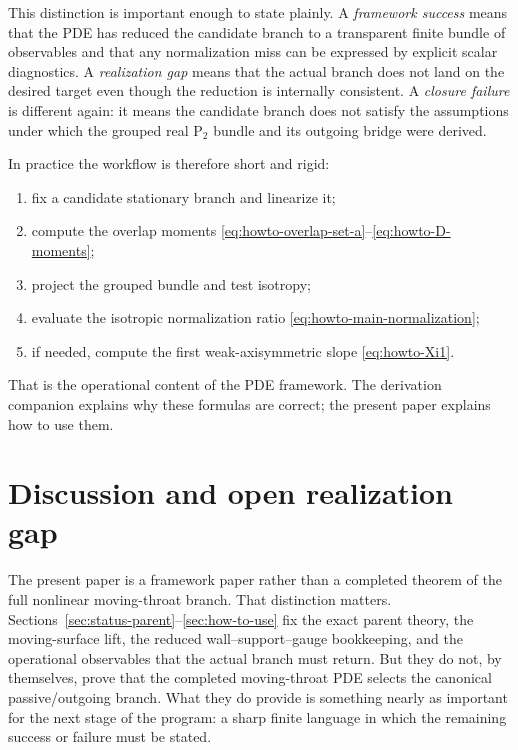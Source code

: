\documentclass[11pt]{article}
\theoremstyle{definition}
\newcommand{\Ptwo}{\ensuremath{\mathrm{P}_2}}
\begin{document}
This distinction is important enough to state plainly. A \emph{framework success} means that the PDE has reduced the candidate branch to a transparent finite bundle of observables and that any normalization miss can be expressed by explicit scalar diagnostics. A \emph{realization gap} means that the actual branch does not land on the desired target even though the reduction is internally consistent. A \emph{closure failure} is different again: it means the candidate branch does not satisfy the assumptions under which the grouped real $\Ptwo$ bundle and its outgoing bridge were derived.

In practice the workflow is therefore short and rigid:
\begin{enumerate}
    \item fix a candidate stationary branch and linearize it;
    \item compute the overlap moments \eqref{eq:howto-overlap-set-a}--\eqref{eq:howto-D-moments};
    \item project the grouped bundle and test isotropy;
    \item evaluate the isotropic normalization ratio \eqref{eq:howto-main-normalization};
    \item if needed, compute the first weak-axisymmetric slope \eqref{eq:howto-Xi1}.
\end{enumerate}
That is the operational content of the PDE framework. The derivation companion explains why these formulas are correct; the present paper explains how to use them.

\section{Discussion and open realization gap}
\label{sec:discussion-gap}

The present paper is a framework paper rather than a completed theorem of the full nonlinear moving-throat branch. That distinction matters. Sections~\ref{sec:status-parent}--\ref{sec:how-to-use} fix the exact parent theory, the moving-surface lift, the reduced wall--support--gauge bookkeeping, and the operational observables that the actual branch must return. But they do not, by themselves, prove that the completed moving-throat PDE selects the canonical passive/outgoing branch. What they do provide is something nearly as important for the next stage of the program: a sharp finite language in which the remaining success or failure must be stated.
\end{document}
